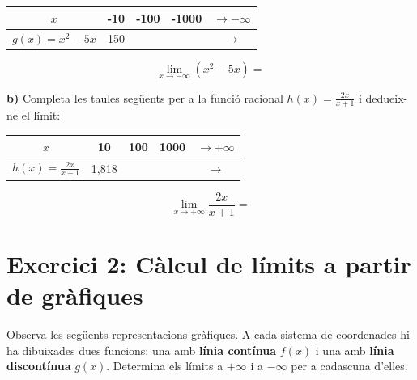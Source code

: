 \documentclass[12pt,a4paper]{article}
\begin{document}
\begin{center}
\renewcommand{\arraystretch}{1.5}
\begin{tabular}{|c|c|c|c|c|}
\hline
$x$ & -10 & -100 & -1000 & $\to -\infty$ \\ \hline
$g(x) = x^2 - 5x$ & 150 & \hspace{2cm} & \hspace{2cm} & $\to$ \hspace{1cm} \\ \hline
\end{tabular}
\end{center}
$$ \lim_{x\to -\infty} (x^2 - 5x) =  $$

\vspace{0.5cm}
\textbf{b)} Completa les taules següents per a la funció racional $h(x) = \frac{2x}{x+1}$ i dedueix-ne el límit:

\begin{center}
\renewcommand{\arraystretch}{1.5}
\begin{tabular}{|c|c|c|c|c|}
\hline
$x$ & 10 & 100 & 1000 & $\to +\infty$ \\ \hline
$h(x) = \frac{2x}{x+1}$ & 1,818 & \hspace{2cm} & \hspace{2cm} & $\to$ \hspace{1cm} \\ \hline
\end{tabular}
\end{center}
$$ \lim_{x\to +\infty} \frac{2x}{x+1} = $$


\newpage
\section*{Exercici 2: Càlcul de límits a partir de gràfiques}

Observa les següents representacions gràfiques. A cada sistema de coordenades hi ha dibuixades dues funcions: una amb \textbf{línia contínua} $f(x)$ i una amb \textbf{línia discontínua} $g(x)$. Determina els límits a $+\infty$ i a $-\infty$ per a cadascuna d'elles.

\vspace{0.5cm}
\end{document}
